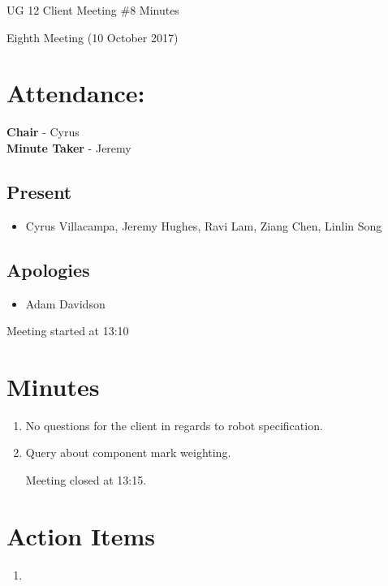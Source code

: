 \documentclass{article}
\begin{document}
\begin{adjustwidth}{2.5em}{0pt}
\begin{center}
\Large{UG 12 Client Meeting \#8  Minutes}\\
\end{center}
\end{adjustwidth}

Eighth Meeting (10 October 2017)
\section{Attendance:}
\textbf{Chair} - Cyrus\\
\textbf{Minute Taker} - Jeremy\\
\subsection*{Present}
\begin{itemize}
\item Cyrus Villacampa, Jeremy Hughes, Ravi Lam, Ziang Chen, Linlin Song
\end{itemize}
\subsection*{Apologies}
\begin{itemize}
\item Adam Davidson
\end {itemize}

Meeting started at 13:10
\section{Minutes}
\begin{enumerate}
\item No questions for the client in regards to robot specification.
\item Query about component mark weighting.

\vspace{.5cm}
Meeting closed at 13:15.
\end{enumerate}

\section{Action Items}
\begin{enumerate}
\item 
\end{enumerate}
\end{document}
